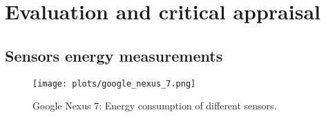 \section{Evaluation and critical appraisal}
\label{s:evaluation}
\subsection{Sensors energy measurements}
\begin{figure}[H]
\centering
\texttt{[image: plots/google\_nexus\_7.png]}
\caption{Google Nexus 7: Energy consumption of different sensors.}
\end{figure}
